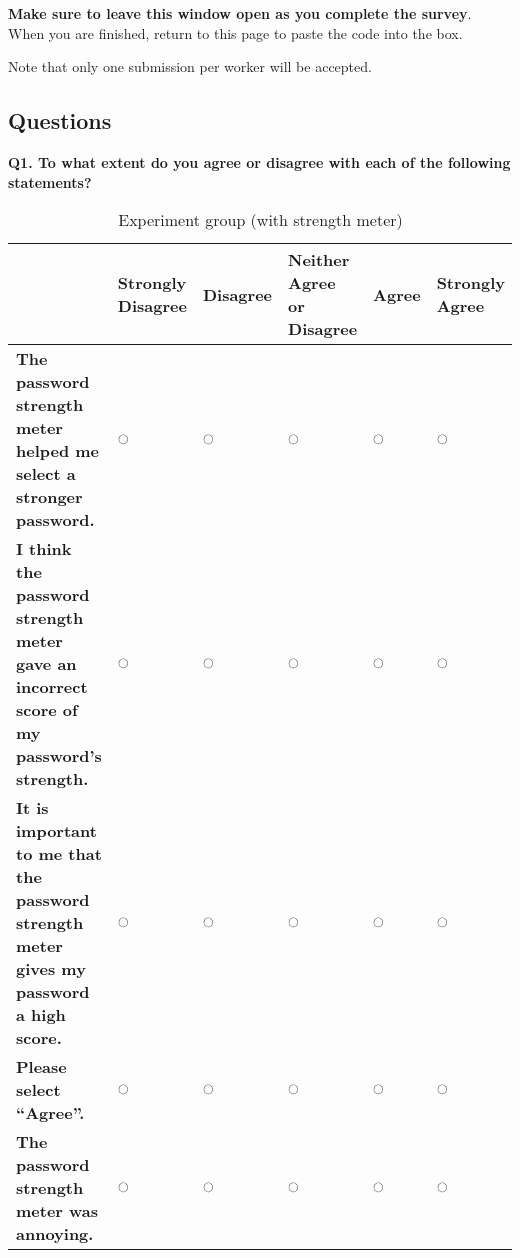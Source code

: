         \textbf{Make sure to leave this window open as you complete the survey}. When you are finished, return to this page to paste the code into the box.

        Note that only one submission per worker will be accepted.


    \subsection{Questions}
    \label{apss:useability_questions}
    {\setmainfont[Mapping=TeX-text,Ligatures=TeX]{Helvetica}
    \textbf{Q1. To what extent do you agree or disagree with each of the following statements?}
      \begin{table}[H]
        \centering
        \scriptsize
        \hspace*{-1cm}
        \begin{tabular}{|P{6.8cm}|P{1.6cm}|P{1.1cm}|P{2.2cm}|P{0.8cm}|P{1.3cm}|}
        \hline
         & \textbf{Strongly Disagree} & \textbf{Disagree} & \textbf{Neither Agree or Disagree} & \textbf{Agree} & \textbf{Strongly Agree} \\
        \hline
        \textbf{The password strength meter helped me select a stronger password.} & $\ocircle$ & $\ocircle$ & $\ocircle$ & $\ocircle$ & $\ocircle$ \\
        \hline
          \textbf{I think the password strength meter gave an incorrect score of my password's strength.} & $\ocircle$ & $\ocircle$ & $\ocircle$ & $\ocircle$ & $\ocircle$ \\
        \hline
          \textbf{It is important to me that the password strength meter gives my password a high score.} & $\ocircle$ & $\ocircle$ & $\ocircle$ & $\ocircle$ & $\ocircle$ \\
        \hline
          \textbf{Please select ``Agree''.} & $\ocircle$ & $\ocircle$ & $\ocircle$ & $\ocircle$ & $\ocircle$ \\
        \hline
        \textbf{The password strength meter was annoying.} & $\ocircle$ & $\ocircle$ & $\ocircle$ & $\ocircle$ & $\ocircle$ \\
        \hline
        \end{tabular}
        \caption{Experiment group (with strength meter)}
      \end{table}

}
